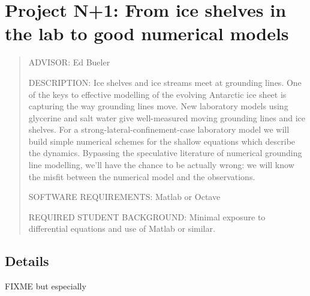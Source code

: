 \documentclass[11pt,final]{amsart}%
\begin{document}
\bigskip\bigskip
\section*{Project N+1: From ice shelves in the lab to good numerical models}

\begin{quote}
\noindent ADVISOR: Ed Bueler

\medskip
\noindent DESCRIPTION:  Ice shelves and ice streams meet at grounding lines.  One of the keys to effective modelling of the evolving Antarctic ice sheet is capturing the way grounding lines move.  New laboratory models using glycerine and salt water give well-measured moving grounding lines and ice shelves.  For a strong-lateral-confinement-case laboratory model \citep{Pegleretal2013} we will build simple numerical schemes for the shallow equations which describe the dynamics.  Bypassing the speculative literature of numerical grounding line modelling, we'll have the chance to be actually wrong: we will know the misfit between the numerical model and the observations.

\medskip
\noindent SOFTWARE REQUIREMENTS: Matlab or Octave

\medskip
\noindent REQUIRED STUDENT BACKGROUND: Minimal exposure to differential equations and use of Matlab or similar.
\end{quote}

\subsection*{Details} FIXME  \cite{PeglerListerWorster2012,PeglerWorster2012,SayagPeglerWorster2012} but especially \cite{Pegleretal2013}

\small

\normalsize
\end{document}
